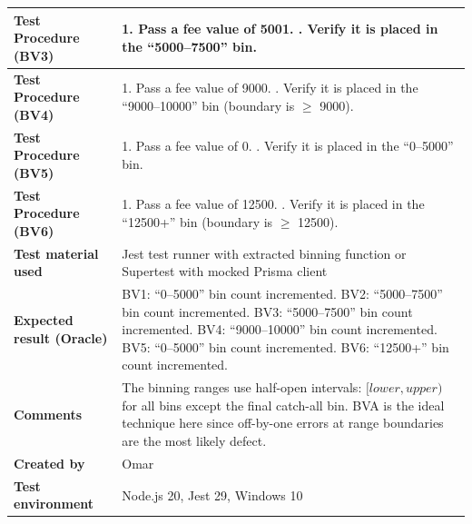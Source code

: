 \begin{table}[h!]
\begin{tabular}{|p{}|p{}|}
\textbf{Test Procedure (BV3)} & 1. Pass a fee value of 5001. \newline 2. Verify it is placed in the ``5000--7500'' bin. \\ \hline
\textbf{Test Procedure (BV4)} & 1. Pass a fee value of 9000. \newline 2. Verify it is placed in the ``9000--10000'' bin (boundary is $\geq$ 9000). \\ \hline
\textbf{Test Procedure (BV5)} & 1. Pass a fee value of 0. \newline 2. Verify it is placed in the ``0--5000'' bin. \\ \hline
\textbf{Test Procedure (BV6)} & 1. Pass a fee value of 12500. \newline 2. Verify it is placed in the ``12500+'' bin (boundary is $\geq$ 12500). \\ \hline
\textbf{Test material used} & Jest test runner with extracted binning function or Supertest with mocked Prisma client \\ \hline
\textbf{Expected result (Oracle)} & BV1: ``0--5000'' bin count incremented. \newline BV2: ``5000--7500'' bin count incremented. \newline BV3: ``5000--7500'' bin count incremented. \newline BV4: ``9000--10000'' bin count incremented. \newline BV5: ``0--5000'' bin count incremented. \newline BV6: ``12500+'' bin count incremented. \\ \hline
\textbf{Comments} & The binning ranges use half-open intervals: $[lower, upper)$ for all bins except the final catch-all bin. BVA is the ideal technique here since off-by-one errors at range boundaries are the most likely defect. \\ \hline
\textbf{Created by} & Omar \\ \hline
\textbf{Test environment} & Node.js 20, Jest 29, Windows 10 \\ \hline
\end{tabular}
\end{table}

